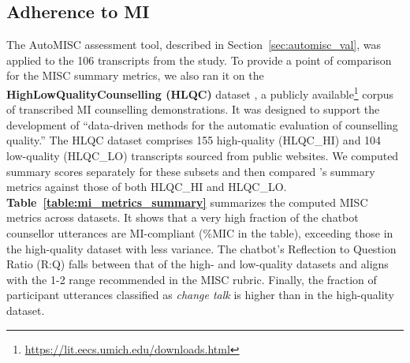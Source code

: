 \subsection{Adherence to MI}
\label{misc_summary_metrics}

The AutoMISC assessment tool, described in Section~\ref{sec:automisc_val}, was applied to the 106 transcripts from the study. To provide a point of comparison for the MISC summary metrics, we also ran it on the \textbf{High\-Low\-Quality\-Counselling (HLQC)} dataset \cite{perez-rosas-etal-2019-makes}, a publicly available\footnote{ \url{https://lit.eecs.umich.edu/downloads.html}} corpus of transcribed MI counselling demonstrations. It was designed to support the development of  ``data-driven methods for the automatic evaluation of counselling quality.'' The HLQC dataset comprises 155 high-quality (HLQC\_HI) and 104 low-quality (HLQC\_LO) transcripts sourced from public websites. We computed summary scores separately for these subsets and then compared \sysname's summary metrics against those of both HLQC\_HI and HLQC\_LO. \textbf{Table~\ref{table:mi_metrics_summary}} summarizes the computed MISC metrics across datasets. It shows that a very high fraction of the chatbot counsellor utterances are MI-compliant (\%MIC in the table), exceeding those in the high-quality dataset with less variance. The chatbot's Reflection to Question Ratio (R:Q) falls between that of the high- and low-quality datasets and aligns with the 1-2 range recommended in the MISC rubric. Finally, the fraction of participant utterances classified as \textit{change talk} is higher than in the high-quality dataset.


